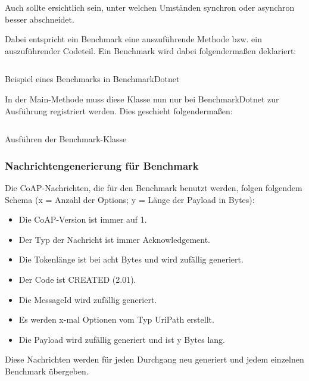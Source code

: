 Auch sollte ersichtlich sein, unter welchen Umständen synchron oder asynchron besser abschneidet.

Dabei entspricht ein Benchmark eine auszuführende Methode bzw. ein auszuführender Codeteil. Ein Benchmark wird dabei folgendermaßen deklariert: 

\begin{listing}[H]
    \inputminted[framesep=2mm, baselinestretch=1.2, fontsize=\normalsize, linenos]{csharp}{codes/benchmark_example.cs}
    \caption{Beispiel eines Benchmarks in BenchmarkDotnet}
    \label{listing:beispiel-eines-benchmarks-in-benchmarkdotnet}
\end{listing}

In der Main-Methode muss diese Klasse nun nur bei BenchmarkDotnet zur Ausführung registriert werden. Dies geschieht folgendermaßen:

\begin{listing}[H]
    \inputminted[framesep=2mm, baselinestretch=1.2, fontsize=\normalsize, linenos]{csharp}{codes/execution_of_benchmark.cs}
    \caption{Ausführen der Benchmark-Klasse}
    \label{listing:ausfuehren-der-benchmark-klasse}
\end{listing}

\subsubsection{Nachrichtengenerierung für Benchmark}
\label{subsubsec:nachrichtengenerierung-fuer-benchmark}

Die CoAP-Nachrichten, die für den Benchmark benutzt werden, folgen folgendem Schema (x = Anzahl der Options; y = Länge der Payload in Bytes):
\begin{itemize}
    \item Die CoAP-Version ist immer auf 1.
    \item Der Typ der Nachricht ist immer Acknowledgement.
    \item Die Tokenlänge ist bei acht Bytes und wird zufällig generiert.
    \item Der Code ist CREATED (2.01).
    \item Die MessageId wird zufällig generiert.
    \item Es werden x-mal Optionen vom Typ UriPath erstellt.
    \item Die Payload wird zufällig generiert und ist y Bytes lang.
\end{itemize}

Diese Nachrichten werden für jeden Durchgang neu generiert und jedem einzelnen Benchmark übergeben.

